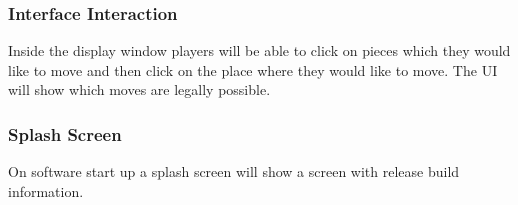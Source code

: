 \subsubsection{Interface Interaction}
Inside the display window players will be able to click on pieces which they
would like to move and then click on the place where they would like to move.
The UI will show which moves are legally possible.

\subsubsection{Splash Screen}
On software start up a splash screen will show a screen with release build
information.
